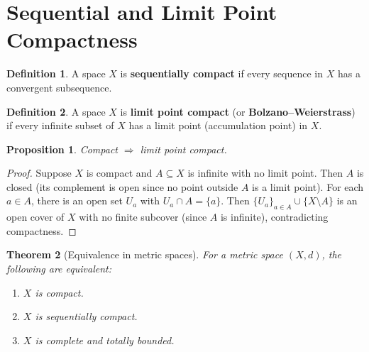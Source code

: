 \documentclass[11pt,a4paper,twoside]{book}
\newtheorem{theorem}{Theorem}[section]
\newtheorem{proposition}[theorem]{Proposition}
\theoremstyle{remark}
\theoremstyle{definition}
\theoremstyle{definition}
\newtheorem{definition}{Definition}[section]
\begin{document}
\section{Sequential and Limit Point Compactness}
\label{sec:sequential-compactness}

\begin{definition}\label{def:sequential-compact}
A space $X$ is \textbf{sequentially compact} if every sequence in $X$ has a
convergent subsequence.
\end{definition}

\begin{definition}\label{def:limit-point-compact}
A space $X$ is \textbf{limit point compact} (or \textbf{Bolzano--Weierstrass})
if every infinite subset of $X$ has a limit point (accumulation point) in $X$.
\end{definition}

\begin{proposition}\label{prop:compact-implies-lpc}
Compact $\Rightarrow$ limit point compact.
\end{proposition}

\begin{proof}
Suppose $X$ is compact and $A \subseteq X$ is infinite with no limit point.
Then $A$ is closed (its complement is open since no point outside $A$ is a
limit point).  For each $a \in A$, there is an open set $U_a$ with
$U_a \cap A = \{a\}$.  Then $\{U_a\}_{a \in A} \cup \{X \setminus A\}$ is an
open cover of $X$ with no finite subcover (since $A$ is infinite), contradicting
compactness.
\end{proof}

\begin{theorem}[Equivalence in metric spaces]\label{thm:metric-compactness}
For a metric space $(X,d)$, the following are equivalent:
\begin{enumerate}
\item $X$ is compact.
\item $X$ is sequentially compact.
\item $X$ is complete and totally bounded.
\end{enumerate}
\end{theorem}
\end{document}
